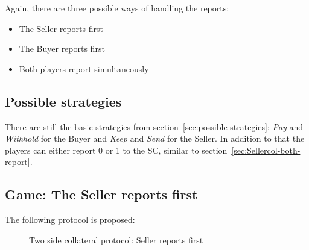 \documentclass{cacthesis}
\begin{document}
Again, there are three possible ways of handling the reports:
\begin{itemize}
    \item The Seller reports first
    \item The Buyer reports first
    \item Both players report simultaneously
\end{itemize}
\subsection{Possible strategies}
There are still the basic strategies from section~\ref{sec:possible-strategies}: \emph{Pay} and \emph{Withhold} for the Buyer and \emph{Keep} and \emph{Send} for the Seller. In addition to that the players can either report 0 or 1 to the SC, similar to section~\ref{sec:Sellercol-both-report}.
\newpage
\subsection{Game: The Seller reports first}
The following protocol is proposed:\newline
\begin{figure}[htb!]
    \centering
    \caption{Two side collateral protocol: Seller reports first}
    \label{pro:two-side-collateral-Seller-first}
\end{figure}
\end{document}
